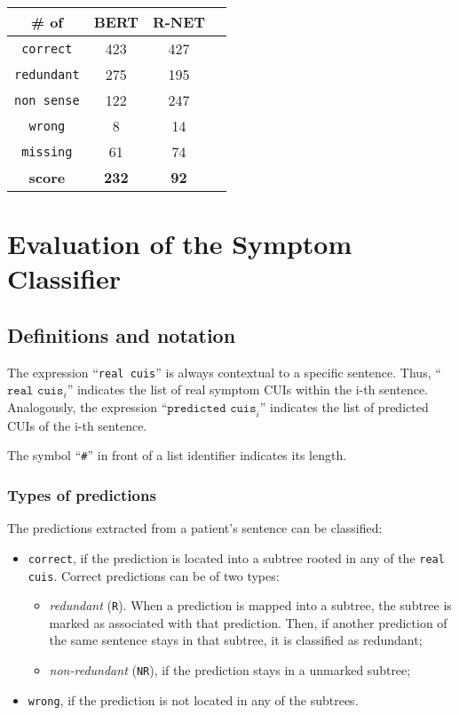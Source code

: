 \begin{center}
 \begin{tabular}{| c | c | c | c |} 
 \hline
 \# of & BERT & R-NET \\ [0.5ex] 
 \hline\hline
 \rowcolor{green}
 \texttt{correct} & 423 & 427 \\ 
 \hline
 \rowcolor{lightgreen}
 \texttt{redundant} & 275 & 195 \\
 \hline
 \rowcolor{red}
 \texttt{non sense} & 122 & 247 \\
 \hline
 \rowcolor{red}
 \texttt{wrong} & 8 & 14 \\
 \hline
 \rowcolor{red}
 \texttt{missing} & 61 & 74 \\
 \hline
  \textbf{score} & \textbf{232} & \textbf{92} \\ 
 \hline
\end{tabular}
\end{center}


\section{Evaluation of the Symptom Classifier}
\subsection{Definitions and notation}

The expression ``\texttt{real cuis}'' is always contextual to a specific sentence. Thus, ``$\texttt{real cuis}_{i}$'' indicates the list of real symptom CUIs within the i-th sentence. Analogously, the expression ``$\texttt{predicted cuis}_{i}$'' indicates the list of predicted CUIs of the i-th sentence.

The symbol ``\texttt{\#}'' in front of a list identifier indicates its length.

\subsubsection{Types of predictions}
The predictions extracted from a patient's sentence can be classified:
\begin{itemize}
  \item \texttt{correct}, if the prediction is located into a subtree rooted in any of the \texttt{real cuis}. Correct predictions can be of two types:
    \begin{itemize}
      \item \textit{redundant} (\texttt{R}). When a prediction is mapped into a subtree, the subtree is marked as associated with that prediction. Then, if another prediction of the same sentence stays in that subtree, it is classified as redundant;
      \item \textit{non-redundant} (\texttt{NR}), if the prediction stays in a unmarked subtree;
    \end{itemize}
  \item \texttt{wrong}, if the prediction is not located in any of the subtrees.
\end{itemize}

